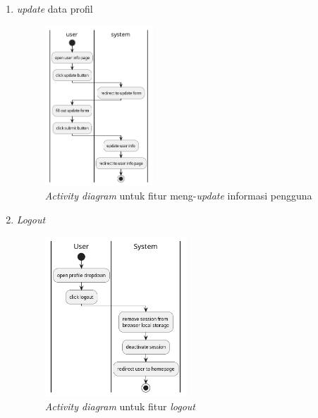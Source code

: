 \documentclass[a4paper]{article}
\begin{document}
\begin{enumerate}
\begin{enumerate}
        \item \textit{update} data profil\\
        \begin{figure}[h]
            \centering
            \includegraphics*[height=6cm]{diagram/activity diagram/5. update user info/update user info.png}
            \caption{\textit{Activity diagram} untuk fitur meng-\textit{update} informasi pengguna}
        \end{figure}
        \item \textit{Logout}\\
        \begin{figure}[h]
            \centering
            \includegraphics*[height=6cm]{diagram/activity diagram/6. logout/logout.png}
            \caption{\textit{Activity diagram} untuk fitur \textit{logout}}
        \end{figure}
        \newpage


\end{enumerate}
\end{enumerate}
\end{document}
